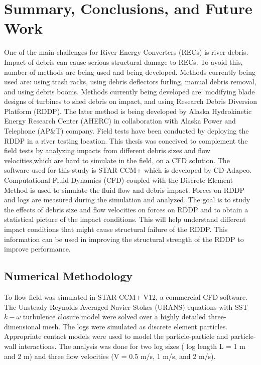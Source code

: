 
\chapter{Summary, Conclusions, and Future Work} %

\label{Chapter5} %

One of the main challenges for River Energy Converters (RECs) is river debris. Impact of debris can cause serious structural damage to RECs. To avoid this, number of methods are being used and being developed. Methods currently being used are: using trash racks, using debris deflectors furling, manual debris removal, and using debris booms. Methods currently being developed are: modifying blade designs of turbines to shed debris on impact, and using Research Debris Diversion Platform (RDDP). The later method is being developed by Alaska Hydrokinetic Energy Research Center (AHERC) in collaboration with Alaska Power and Telephone (AP\&T) company. Field tests have been conducted by deploying the RDDP in a river testing location. This thesis was conceived to complement the field tests by analyzing impacts from different debris sizes and flow velocities,which are hard to simulate in the field, on a CFD solution. The software used for this study is STAR-CCM+ which is developed by CD-Adapco. Computational Fluid Dynamics (CFD) coupled with the Discrete Element Method is used to simulate the fluid flow and debris impact. Forces on RDDP and logs are measured during the simulation and analyzed. The goal is to study the effects of debris size and flow velocities on forces on RDDP and to obtain a statistical picture of the impact conditions. This will help understand different impact conditions that might cause structural failure of the RDDP. This information can be used in improving the structural strength of the RDDP to improve performance. 

\section{Numerical Methodology}
To flow field was simulated in STAR-CCM+ V12, a commercial CFD software. The Unsteady Reynolds Averaged Navier-Stokes (URANS) equations with SST $k-\omega$ turbulence closure model were solved over a highly detailed three-dimensional mesh. The logs were simulated as discrete element particles. Appropriate contact models were used to model the particle-particle and particle-wall interactions. The analysis was done for two log sizes ( log length L = 1 m and 2 m) and three flow velocities (V = 0.5 m/s, 1 m/s, and 2 m/s). 

